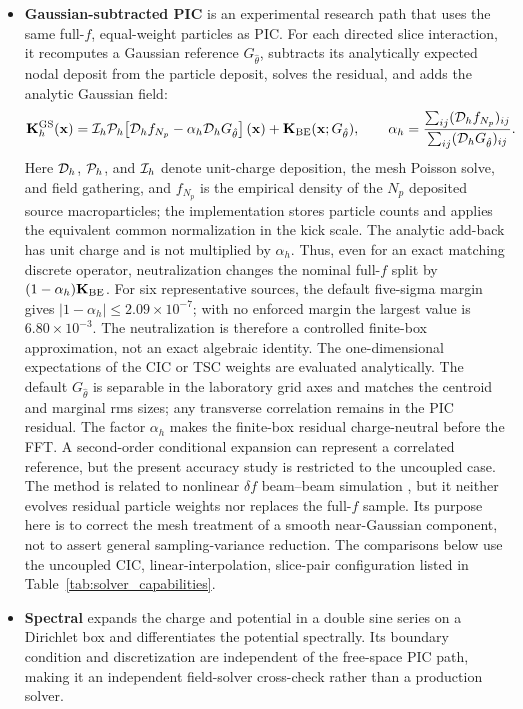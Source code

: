 \documentclass[a4paper,fleqn]{cas-sc}
\begin{document}
\begin{itemize}
\item \textbf{Gaussian-subtracted PIC} is an experimental research path that
uses the same full-$f$, equal-weight particles as PIC.  For each directed
slice interaction, it recomputes a
Gaussian reference $G_{\hat\theta}$, subtracts its analytically expected
nodal deposit from the particle deposit, solves the residual, and adds
the analytic Gaussian field:
\begin{equation}
  \mathbf K_h^{\rm GS}(\mathbf x)
  ={\cal I}_h{\cal P}_h\!\left[
    {\cal D}_h f_{N_p}-\alpha_h{\cal D}_hG_{\hat\theta}\right](\mathbf x)
   +\mathbf K_{\rm BE}(\mathbf x;G_{\hat\theta}),\qquad
  \alpha_h=\frac{\sum_{ij}({\cal D}_h f_{N_p})_{ij}}
                  {\sum_{ij}({\cal D}_hG_{\hat\theta})_{ij}} .
  \label{eq:hybrid}
\end{equation}
Here ${\cal D}_h$, ${\cal P}_h$, and ${\cal I}_h$ denote unit-charge
deposition, the mesh Poisson solve, and field gathering, and $f_{N_p}$ is the
empirical density of the $N_p$ deposited source macroparticles; the
implementation
stores particle counts and applies the equivalent common normalization in the
kick scale.  The analytic add-back has unit charge and is not multiplied by
$\alpha_h$.  Thus, even for an exact matching discrete operator,
neutralization changes the nominal full-$f$ split by
$(1-\alpha_h)\mathbf K_{\rm BE}$.  For six representative sources,
the default five-sigma margin gives $|1-\alpha_h|\leq2.09\times10^{-7}$;
with no enforced margin the largest value is $6.80\times10^{-3}$.  The
neutralization is therefore a controlled finite-box approximation, not an
exact algebraic identity.  The one-dimensional
expectations of the CIC or TSC weights are evaluated analytically.  The
default $G_{\hat\theta}$ is separable in the laboratory grid axes and matches
the centroid and marginal rms sizes; any transverse correlation remains in
the PIC residual.  The factor $\alpha_h$ makes the finite-box residual
charge-neutral before the FFT.  A second-order conditional expansion can
represent a correlated reference, but the present accuracy study is restricted
to the uncoupled case.  The method is
related to nonlinear $\delta f$ beam--beam simulation
\citep{KogaTajima1995,CaiDeltaf2000}, but it neither evolves residual particle
weights nor replaces the full-$f$ sample.  Its purpose here is to correct the
mesh treatment of a smooth near-Gaussian component, not to assert general
sampling-variance reduction.  The comparisons below use the uncoupled CIC,
linear-interpolation, slice-pair configuration listed in
Table~\ref{tab:solver_capabilities}.

\item \textbf{Spectral} expands the charge and potential in a double sine
series on a Dirichlet box and differentiates the potential spectrally.  Its
boundary condition and discretization are independent of the free-space PIC
path, making it an independent field-solver cross-check rather than a
production solver.
\end{itemize}
\end{document}
